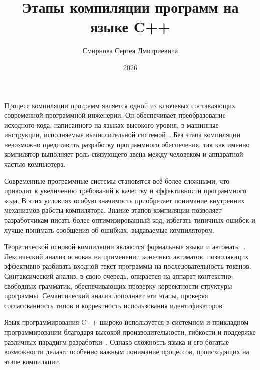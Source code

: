 \documentclass[coursework]{SCWorks}
\begin{document}
\title{Этапы компиляции программ на языке C++}
\author{Смирнова Сергея Дмитриевича}
\date{2026}

\maketitle
\secNumbering
\tableofcontents

\intro

Процесс компиляции программ является одной из ключевых составляющих современной программной инженерии. 
Он обеспечивает преобразование исходного кода, написанного на языках высокого уровня, 
в машинные инструкции, исполняемые вычислительной системой~\cite{aho2007compilers}. 
Без этапа компиляции невозможно представить разработку программного обеспечения, 
так как именно компилятор выполняет роль связующего звена между человеком и аппаратной частью компьютера.

Современные программные системы становятся всё более сложными, что приводит к увеличению требований 
к качеству и эффективности программного кода. В этих условиях особую значимость приобретает понимание 
внутренних механизмов работы компилятора. Знание этапов компиляции позволяет разработчикам писать 
более оптимизированный код, избегать типичных ошибок и лучше понимать сообщения об ошибках, 
выдаваемые компилятором.

Теоретической основой компиляции являются формальные языки и автоматы~\cite{hopcroft2006automata}. 
Лексический анализ основан на применении конечных автоматов, позволяющих эффективно разбивать 
входной текст программы на последовательность токенов. Синтаксический анализ, в свою очередь, 
опирается на аппарат контекстно-свободных грамматик, обеспечивающих проверку корректности структуры программы. 
Семантический анализ дополняет эти этапы, проверяя согласованность типов и корректность использования 
идентификаторов.

Язык программирования C++ широко используется в системном и прикладном программировании благодаря 
высокой производительности, гибкости и поддержке различных парадигм разработки~\cite{stroustrup2013cpp}. 
Однако сложность языка и его богатые возможности делают особенно важным понимание процессов, происходящих 
на этапе компиляции.
\end{document}
